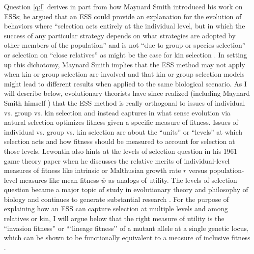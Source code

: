 \documentclass[11pt]{article}
\newcommand{\mean}[1]{\overline{#1}}
\begin{document}
Question \ref{q:I} derives in part from how Maynard Smith introduced his work on ESSs; he argued that an ESS could provide an explanation for the evolution of behaviors where ``selection acts entirely at the individual level, but in which the success of any particular strategy depends on what strategies are adopted by other members of the population'' \cite[p. 210]{Maynard-Smith:1974} and is not ``due to group or species selection'' \cite[p. 15]{Maynard-Smith:Price:1973} or selection on ``close relatives'' \cite[p. 210]{Maynard-Smith:1974} as might be the case for kin selection \cite{Hamilton:1964}. In setting up this dichotomy, Maynard Smith implies that the ESS method may not apply when kin or group selection are involved and that kin or group selection models might lead to different results when applied to the same biological scenario. As I will describe below, evolutionary theorists have since realized (including Maynard Smith himself \cite[p. 33]{MaynardSmith:1978}) that the ESS method is really orthogonal to issues of individual vs. group vs. kin selection and instead captures in what sense evolution via natural selection optimizes fitness given a specific measure of fitness. Issues of individual vs. group vs. kin selection are about the ``units'' or ``levels'' at which selection acts and how fitness should be measured to account for selection at those levels. Lewontin also hints at the levels of selection question in his 1961 game theory paper when he discusses the relative merits of individual-level measures of fitness like intrinsic or Malthusian growth rate $r$ versus population-level measures like mean fitness $\mean{w}$ \cite[pp. 400-401]{Lewontin:1961} as analogs of utility. The levels of selection question became a major topic of study in evolutionary theory \cite[e.g.,][]{Lewontin:1970,Dawkins:1982,Wilson:Sober:1989,Maynard-Smith:Szathmary:1995,Wilson:1997,Michod:1999,Michod:2006,Szathmary:2015} and philosophy of biology \cite{Hull:1980,Brandon:1982,Damuth:Heisler:1988,Lloyd:1992,Lloyd:1994,Sober:Wilson:1994,Okasha:2006,Okasha:2016} and continues to generate substantial research \cite[e.g.,][]{Black:Bourrat:2020,Cooney:Mori:2022,Veit:2022}. For the purpose of explaining how an ESS can capture selection at multiple levels and among relatives or kin, I will argue below that the right measure of utility is the ``invasion fitness'' \cite{Metz:Nisbet:1992,Heino:Metz:1998} or ```lineage fitness'' \cite{Lehmann:Alger:2015,Akcay:VanCleve:2016,Lehmann:Mullon:2016} of a mutant allele at a single genetic locus, which can be shown to be functionally equivalent to a measure of inclusive fitness \cite{Lehmann:Mullon:2016,Lehmann:Rousset:2020}.
\end{document}
